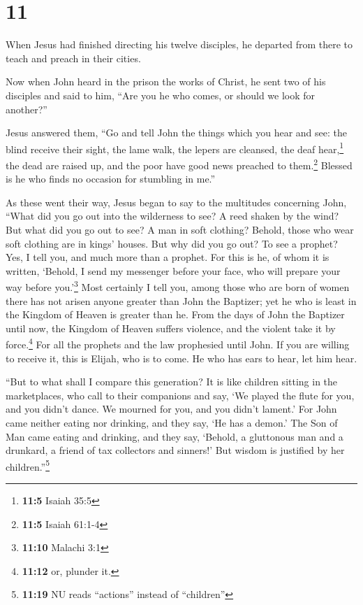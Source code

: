 \hypertarget{section-10}{%
\section{11}\label{section-10}}

 When Jesus had finished directing his twelve disciples,
he departed from there to teach and preach in their cities.

 Now when John heard in the prison the works of Christ, he
sent two of his disciples  and said to him, ``Are you he
who comes, or should we look for another?''

 Jesus answered them, ``Go and tell John the things which
you hear and see:  the blind receive their sight, the lame
walk, the lepers are cleansed, the deaf hear,\footnote{\textbf{11:5}
  Isaiah 35:5} the dead are raised up, and the poor have good news
preached to them.\footnote{\textbf{11:5} Isaiah 61:1-4} 
Blessed is he who finds no occasion for stumbling in me.''

 As these went their way, Jesus began to say to the
multitudes concerning John, ``What did you go out into the wilderness to
see? A reed shaken by the wind?  But what did you go out
to see? A man in soft clothing? Behold, those who wear soft clothing are
in kings' houses.  But why did you go out? To see a
prophet? Yes, I tell you, and much more than a prophet. 
For this is he, of whom it is written, `Behold, I send my messenger
before your face, who will prepare your way before you.'\footnote{\textbf{11:10}
  Malachi 3:1}  Most certainly I tell you, among those
who are born of women there has not arisen anyone greater than John the
Baptizer; yet he who is least in the Kingdom of Heaven is greater than
he.  From the days of John the Baptizer until now, the
Kingdom of Heaven suffers violence, and the violent take it by
force.\footnote{\textbf{11:12} or, plunder it.}  For all
the prophets and the law prophesied until John.  If you
are willing to receive it, this is Elijah, who is to come.
 He who has ears to hear, let him hear.

 ``But to what shall I compare this generation? It is
like children sitting in the marketplaces, who call to their companions
 and say, `We played the flute for you, and you didn't
dance. We mourned for you, and you didn't lament.'  For
John came neither eating nor drinking, and they say, `He has a demon.'
 The Son of Man came eating and drinking, and they say,
`Behold, a gluttonous man and a drunkard, a friend of tax collectors and
sinners!' But wisdom is justified by her children.''\footnote{\textbf{11:19}
  NU reads ``actions'' instead of ``children''}

